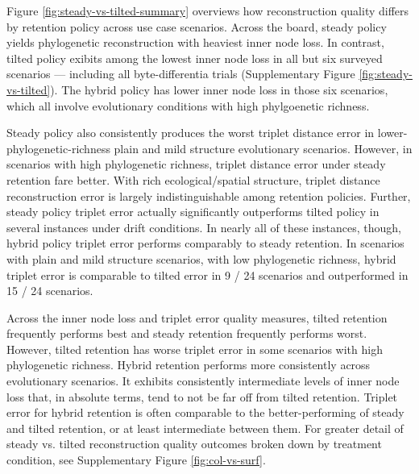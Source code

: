Figure \ref{fig:steady-vs-tilted-summary} overviews how reconstruction quality differs by retention policy across use case scenarios.
Across the board, steady policy yields phylogenetic reconstruction with heaviest inner node loss.
In contrast, tilted policy exibits among the lowest inner node loss in all but six surveyed scenarios --- including all byte-differentia trials (Supplementary Figure \ref{fig:steady-vs-tilted}).
The hybrid policy has lower inner node loss in those six scenarios, which all involve evolutionary conditions with high phylgoenetic richness.

Steady policy also consistently produces the worst triplet distance error in lower-phylogenetic-richness plain and mild structure evolutionary scenarios.
However, in scenarios with high phylogenetic richness, triplet distance error under steady retention fare better.
With rich ecological/spatial structure, triplet distance reconstruction error is largely indistinguishable among retention policies.
Further, steady policy triplet error actually significantly outperforms tilted policy in several instances under drift conditions.
In nearly all of these instances, though, hybrid policy triplet error performs comparably to steady retention.
In scenarios with plain and mild structure scenarios, with low phylogenetic richness, hybrid triplet error is comparable to tilted error in 9 / 24 scenarios and outperformed in 15 / 24 scenarios.

Across the inner node loss and triplet error quality measures, tilted retention frequently performs best and steady retention frequently performs worst.
However, tilted retention has worse triplet error in some scenarios with high phylogenetic richness.
Hybrid retention performs more consistently across evolutionary scenarios.
It exhibits consistently intermediate levels of inner node loss that, in absolute terms, tend to not be far off from tilted retention.
Triplet error for hybrid retention is often comparable to the better-performing of steady and tilted retention, or at least intermediate between them.
For greater detail of steady vs. tilted reconstruction quality outcomes broken down by treatment condition, see Supplementary Figure \ref{fig:col-vs-surf}.



